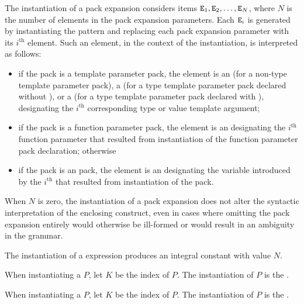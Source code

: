 \documentclass{wg21}
\begin{document}
\pnum
The instantiation of a pack expansion considers
items $\texttt{E}_1, \texttt{E}_2, \dotsc, \texttt{E}_N$,
where
$N$ is the number of elements in the pack expansion parameters.
Each $\texttt{E}_i$ is generated by instantiating the pattern and
replacing each pack expansion parameter with its $i^\text{th}$ element.
Such an element, in the context of the instantiation, is interpreted as
follows:
\begin{itemize}
    \item
    if the pack is a template parameter pack, the element is
    an 
    (for a non-type template parameter pack),
    a 
    (for a type template parameter pack declared without ), or
    a 
    (for a type template parameter pack declared with ),
    designating the $i^\text{th}$ corresponding type or value template argument;

    \item
    if the pack is a function parameter pack, the element is an
    designating the $i^\text{th}$ function parameter
    that resulted from instantiation of
    the function parameter pack declaration;
    otherwise

    \item
    if the pack is an  pack,
    the element is an 
    designating the variable introduced by
    the $i^\text{th}$ 
    that resulted from instantiation of
    the  pack.
\end{itemize}
When $N$ is zero, the instantiation of a pack expansion
does not alter the syntactic interpretation of the enclosing construct,
even in cases where omitting the pack expansion entirely would
otherwise be ill-formed or would result in an ambiguity in the grammar.

\pnum
The instantiation of a  expression  produces
an integral constant with value $N$.

\begin{addedblock}
\pnum

When instantiating a  $P$,
let $K$ be the index of $P$.
The instantiation of $P$ is the  .


When instantiating a  $P$,
let $K$ be the index of $P$.
The instantiation of $P$ is the  .
\end{addedblock}
\end{document}
